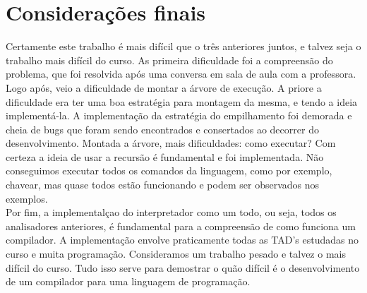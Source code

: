 \documentclass[a4paper,10pt]{article}
\begin{document}
\section{Considerações finais}		
	Certamente este trabalho é mais difícil que o três anteriores juntos, e talvez seja o trabalho mais difícil do curso. As primeira dificuldade
	foi a compreensão do problema, que foi resolvida após uma conversa em sala de aula com a professora. Logo após, veio a dificuldade de montar
	a árvore de execução. A priore a dificuldade era ter uma boa estratégia para montagem da mesma, e tendo a ideia implementá-la. A implementação
	da estratégia do empilhamento foi demorada e cheia de bugs que foram sendo encontrados e consertados ao decorrer do desenvolvimento. Montada a
	árvore, mais dificuldades: como executar? Com certeza a ideia de usar a recursão é fundamental e foi implementada. Não conseguimos executar
	todos os comandos da linguagem, como por exemplo, chavear, mas quase todos estão funcionando e podem ser observados nos exemplos.
	\\
	Por fim, a implementalçao do interpretador como um todo, ou seja, todos os analisadores anteriores, é fundamental para a compreensão de como 
	funciona um compilador. A implementação envolve praticamente todas as TAD's estudadas no curso e muita programação. Consideramos um trabalho
	pesado e talvez o mais difícil do curso. Tudo isso serve para demostrar o quão difícil é o desenvolvimento de um compilador para uma linguagem
	de programação.
	
	
	
	
	
	
	
	
	
	
	
	
	
	
	
	
	
	
	
	
	
	
\end{document}
